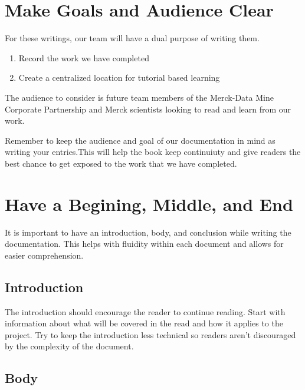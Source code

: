 \documentclass[]{book}
\begin{document}
\hypertarget{make-goals-and-audience-clear}{%
\section{Make Goals and Audience Clear}\label{make-goals-and-audience-clear}}

For these writings, our team will have a dual purpose of writing them.

\begin{enumerate}
\def\labelenumi{\arabic{enumi}.}
\item
  Record the work we have completed
\item
  Create a centralized location for tutorial based learning
\end{enumerate}

The audience to consider is future team members of the Merck-Data Mine Corporate Partnership and Merck scientists looking to read and learn from our work.

Remember to keep the audience and goal of our documentation in mind as writing your entries.This will help the book keep continuiuty and give readers the best chance to get exposed to the work that we have completed.

\hypertarget{have-a-begining-middle-and-end}{%
\section{Have a Begining, Middle, and End}\label{have-a-begining-middle-and-end}}

It is important to have an introduction, body, and conclusion while writing the documentation. This helps with fluidity within each document and allows for easier comprehension.

\hypertarget{introduction}{%
\subsection{Introduction}\label{introduction}}

The introduction should encourage the reader to continue reading. Start with information about what will be covered in the read and how it applies to the project. Try to keep the introduction less technical so readers aren't discouraged by the complexity of the document.

\hypertarget{body}{%
\subsection{Body}\label{body}}
\end{document}
